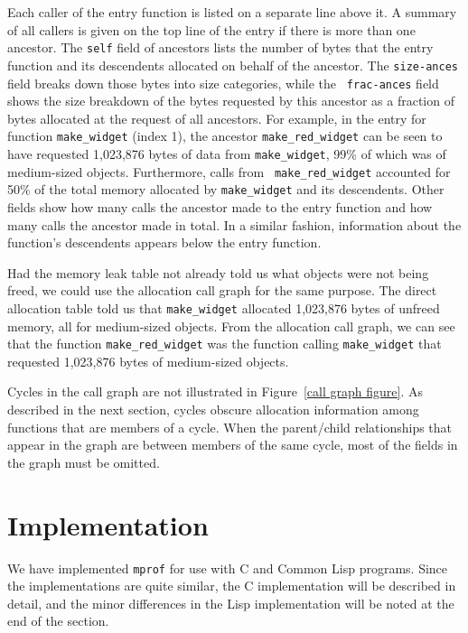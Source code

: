 Each caller of the entry function is listed on a separate line above
it.  A summary of all callers is given on the top line of the entry if
there is more than one ancestor.  The {\tt self} field of ancestors
lists the number of bytes that the entry function and its descendents
allocated on behalf of the ancestor.  The {\tt size-ances} field
breaks down those bytes into size categories, while the {\tt
frac-ances} field shows the size breakdown of the bytes requested by
this ancestor as a fraction of bytes allocated at the request of all
ancestors.  For example, in the entry for function {\tt make\_widget}
(index 1), the ancestor {\tt make\_red\_widget} can be seen to have
requested 1,023,876 bytes of data from {\tt make\_widget}, 99\% of which
was of medium-sized objects.  Furthermore, calls from {\tt
make\_red\_widget} accounted for 50\% of the total memory allocated by
{\tt make\_widget} and its descendents.  Other fields show how many
calls the ancestor made to the entry function and how many calls the
ancestor made in total.  In a similar fashion, information about the
function's descendents appears below the entry function.

Had the memory leak table not already told us what objects were not
being freed, we could use the allocation call graph for the same
purpose.  The direct allocation table told us that {\tt make\_widget}
allocated 1,023,876 bytes of unfreed memory, all for medium-sized
objects.  From the allocation call graph, we can see that the function
{\tt make\_red\_widget} was the function calling {\tt make\_widget}
that requested 1,023,876 bytes of medium-sized objects.  

Cycles in the call graph are not illustrated in Figure~\ref{call graph
figure}.  As described in the next section, cycles obscure allocation
information among functions that are members of a cycle.  When the
parent/child relationships that appear in the graph are between
members of the same cycle, most of the fields in the graph must be
omitted.


\section{Implementation}
\label{implementing mprof}

We have implemented {\tt mprof} for use with C and Common Lisp
programs.  Since the implementations are quite similar, the C
implementation will be described in detail, and the minor differences
in the Lisp implementation will be noted at the end of the section.

